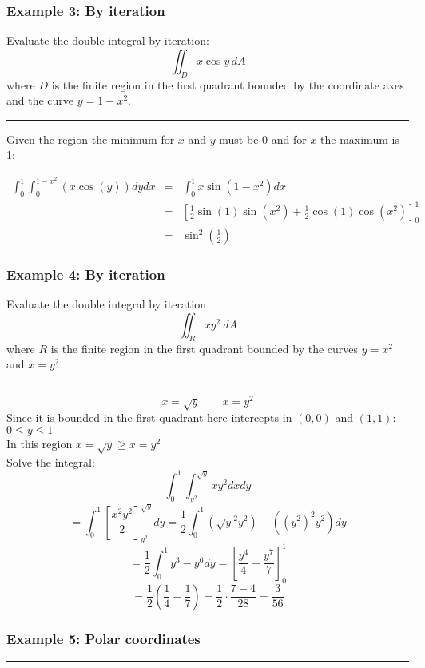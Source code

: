 \subsubsection{Example 3: By iteration}
Evaluate the double integral by iteration:
$$\iint_{D}x\cos y\,d A$$
where $D$ is the finite region in the first quadrant bounded by the coordinate axes and the curve
$y=1-x^2$.

\rule{\textwidth}{0.5pt}

Given the region the minimum for $x$ and $y$ must be $0$ and for $x$ the maximum is 1:

\begin{eqnarray*}
  \int_{0}^{1}\int_{0}^{1-x^2}(x\cos(y))dydx&=&\int_{0}^{1}x \sin \left(1-x^2\right)dx\\
                                            &=&\left[\frac{1}{2} \sin (1) \sin \left(x^2\right)+\frac{1}{2} \cos (1) \cos \left(x^2\right)\right]^1_0\\
                                            &=&\boxed{\sin ^2\left(\frac{1}{2}\right)}
\end{eqnarray*}

\subsubsection{Example 4: By iteration}
Evaluate the double integral by iteration
$$\iint_Rxy^2\ dA$$
where $R$ is the finite region in the first quadrant bounded by the curves $y=x^2$ and $x=y^2$

\rule{\textwidth}{0.5pt}
$$x=\sqrt{y}\qquad x=y^2$$
Since it is bounded in the first quadrant here intercepts in $(0,0)$ and $(1,1)$: $0\leq y\leq 1$\\
In this region $x=\sqrt{y}\geq x=y^2$\\
Solve the integral:
$$\int_0^1\int_{y^2}^{\sqrt{y}}xy^2 dxdy$$
$$=\int_0^1 \left[\frac{x^2y^2}{2}\right]_{y^2}^{\sqrt{y}}dy=\frac{1}{2}\int_0^1 (\sqrt{y}^2y^2)-((y^2)^2y^2)dy$$
$$=\frac{1}{2}\int_0^1 y^3-y^6dy=\left[\frac{y^4}{4}-\frac{y^7}{7}\right]_0^1$$
$$=\frac{1}{2}\left(\frac{1}{4}- \frac{1}{7}\right)=\frac{1}{2}\cdot \frac{7-4}{28}=\frac{3}{56}$$
\subsubsection{Example 5: Polar coordinates}

\rule{\textwidth}{0.5pt}


